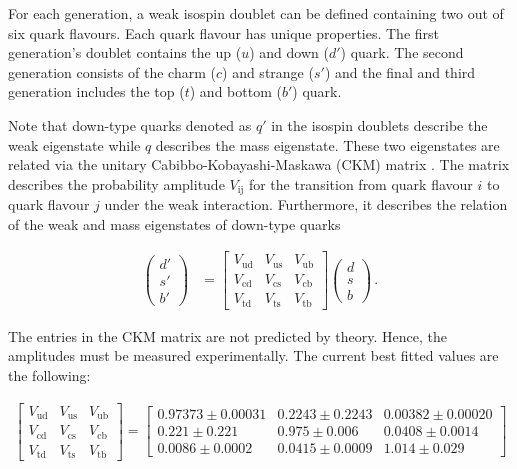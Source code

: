 \documentclass[bachelor,ngerman,english]{GAUBM}
\begin{document}
For each generation, a weak isospin doublet can be defined containing two out of six quark flavours. Each quark flavour has unique properties. The first generation's doublet contains the up ($u$) and down ($d'$) quark. The second generation consists of the charm ($c$) and strange ($s'$) and the final and third generation includes the top ($t$) and bottom ($b'$) quark. %

Note that down-type quarks denoted as $q'$ in the isospin doublets describe the weak eigenstate while $q$ describes the mass eigenstate. These two eigenstates are related via the unitary Cabibbo-Kobayashi-Maskawa (CKM) matrix \cite{theory:ckm_matrix_01,theory:ckm_matrix_02}. The matrix describes the probability amplitude $V_\text{ij}$ for the transition from quark flavour $i$ to quark flavour $j$ under the weak interaction. Furthermore, it describes the relation of the weak and mass eigenstates of down-type quarks

\begin{align}
    \begin{pmatrix}
        d'\\
        s'\\
        b'
    \end{pmatrix} &=
    \begin{bmatrix}
        V_\text{ud} & V_\text{us} & V_\text{ub}\\
        V_\text{cd} & V_\text{cs} & V_\text{cb}\\
        V_\text{td} & V_\text{ts} & V_\text{tb}
    \end{bmatrix}
    \begin{pmatrix}
        d\\
        s\\
        b
    \end{pmatrix}
    \label{eq:down-type_weak_mass_eigentstates}\,.
\end{align}

The entries in the CKM matrix are not predicted by theory. Hence, the amplitudes must be measured experimentally. The current best fitted values \cite{pdg} are the following:

\begin{align}
    \begin{bmatrix}
        V_\text{ud} & V_\text{us} & V_\text{ub}\\
        V_\text{cd} & V_\text{cs} & V_\text{cb}\\
        V_\text{td} & V_\text{ts} & V_\text{tb}
    \end{bmatrix} = 
    \begin{bmatrix}
        0.97373\pm0.00031   & 0.2243\pm0.2243   & 0.00382\pm0.00020\\
        0.221\pm0.221       & 0.975\pm0.006     & 0.0408\pm0.0014\\
        0.0086\pm0.0002     & 0.0415\pm0.0009   & 1.014\pm0.029
    \end{bmatrix}
    \label{eq:ckm_matrix}
\end{align}
\end{document}
